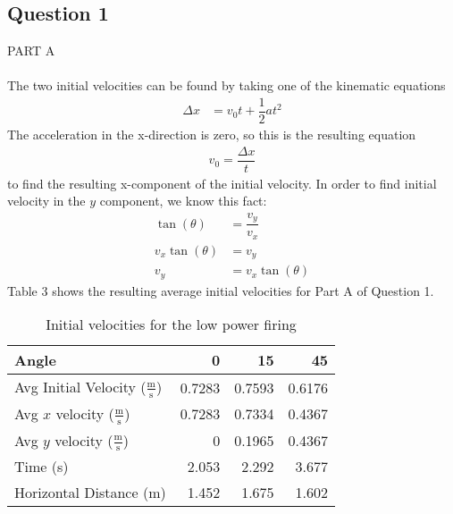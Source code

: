 \documentclass [12pt, letterpaper, twoside] {article}
\begin{document}
\subsection* {Question 1}
PART A \\\\
The two initial velocities can be found by taking one of the kinematic equations
\begin {equation}
  \begin {split}
    \Delta {x} & = v_{0}t + \dfrac{1}{2}at^{2} 
  \end {split}
\end {equation}
The acceleration in the x-direction is zero, so this is the resulting equation 
\begin {equation}
  \begin {split}
    v_{0} = \dfrac{\Delta{x}}{t}
  \end {split}
\end {equation}
to find the resulting x-component of the initial velocity. In order to find initial velocity in the \(y\) component, we know this fact:
\begin {equation}
  \begin {split}
    \tan(\theta) & = \dfrac{v_{y}}{v_{x}} \\
    v_{x}\tan({\theta}) & = v_{y} \\
    v_{y} & = v_{x}\tan(\theta)
  \end {split}
\end {equation}
Table 3 shows the resulting average initial velocities for Part A of Question 1.
\begin {table}[h]
  \centering
  \begin {tabular} {| l | r | r | r |}
    \hline\hline
    Angle & 0 & 15 & 45 \\
    \hline
    Avg Initial Velocity (\(\tfrac{\text{m}}{\text{s}}\)) & 0.7283 & 0.7593 & 0.6176 \\
    \hline
    Avg \(x\) velocity (\(\tfrac{\text{m}}{\text{s}}\)) & 0.7283 & 0.7334 & 0.4367 \\
    \hline
    Avg \(y\) velocity (\(\tfrac{\text{m}}{\text{s}}\)) & 0 & 0.1965 & 0.4367 \\
    \hline
    Time (s) & 2.053 & 2.292 & 3.677 \\
    \hline
    Horizontal Distance (m) & 1.452 & 1.675 & 1.602 \\
    \hline\hline
  \end {tabular}
  \caption {Initial velocities for the low power firing}
\end {table}
\end{document}
